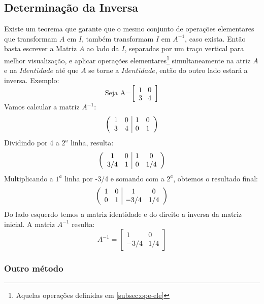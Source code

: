 \subsection{Determinação da Inversa}
Existe um teorema que garante que o mesmo conjunto de operações elementares que transformam $A$ em $I$, também transformam $I$ em $A^{-1}$, caso exista. Então basta escrever a Matriz $A$ ao lado da $I$, separadas por um traço vertical para melhor visualização, e aplicar operações elementares\footnote{Aquelas operações definidas em \ref{subsec:ope-ele}} simultaneamente na atriz $A$ e na $Identidade$ até que $A$ se torne a $Identidade$, então do outro lado estará a inversa. Exemplo:
\begin{displaymath}
\text{Seja A=}
\begin{bmatrix}
  1 & 0 \\ 3 & 4
\end{bmatrix}
\end{displaymath}
Vamos calcular a matriz $A^{-1}$:
\begin{displaymath}
\left(
\begin{array}{c c|c c}
  1 & 0 & 1 & 0\\3 & 4 & 0 & 1
\end{array}\right)
\end{displaymath}
Dividindo por 4 a $2^a$ linha, resulta:
\begin{displaymath}
\left(\begin{array}{c c|c c}
  1 & 0 & 1 & 0\\3/4 & 1 & 0 & 1/4
\end{array}\right)
\end{displaymath}
Multiplicando a $1^a$ linha por -3/4 e somando com a $2^a$, obtemos o resultado final:
\begin{displaymath}
\left(\begin{array}{c c|c c}
  1 & 0 & 1 & 0\\0 & 1 & -3/4 & 1/4
\end{array}\right)
\end{displaymath}
Do lado esquerdo temos a matriz identidade e do direito a inversa da matriz inicial.
A matriz $A^{-1}$ resulta:
\begin{displaymath}
A^{-1}=\begin{bmatrix}
  1 & 0 \\ -3/4 & 1/4
\end{bmatrix}
\end{displaymath}
\subsubsection{Outro método}
